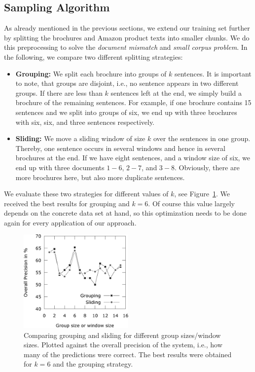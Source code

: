 \subsection{Sampling Algorithm}
As already mentioned in the previous sections, we extend our training set further by splitting the brochures and Amazon product texts into smaller chunks.
We do this preprocessing to solve the \emph{document mismatch} and \emph{small corpus problem}.
In the following, we compare two different splitting strategies:
\begin{itemize}
	\item
		\textbf{Grouping:}
		We split each brochure into groups of $k$ sentences.
		It is important to note, that groups are disjoint, i.e., no sentence appears in two different groups.
		If there are less than $k$ sentences left at the end, we simply build a brochure of the remaining sentences.
		For example, if one brochure contains 15 sentences and we split into groups of six, we end up with three brochures with six, six, and three sentences respectively.
	\item
		\textbf{Sliding:}
		We move a sliding window of size $k$ over the sentences in one group.
		Thereby, one sentence occurs in several windows and hence in several brochures at the end.
		If we have eight sentences, and a window size of six, we end up with three documents $1 - 6$, $2 - 7$, and $3 - 8$.
		Obviously, there are more brochures here, but also more duplicate sentences.
\end{itemize}

We evaluate these two strategies for different values of $k$, see Figure~\ref{fig:sampling_optimization}.
We received the best results for grouping and $k = 6$.
Of course this value largely depends on the concrete data set at hand, so this optimization needs to be done again for every application of our \nto approach.

\begin{figure}
	\begin{center}
		\includegraphics[width=0.5\textwidth]{figures/sampling_optimization.eps}
	\end{center}
	\caption{Comparing grouping and sliding for different group sizes/window sizes. Plotted against the overall precision of the system, i.e., how many of the predictions were correct. The best results were obtained for $k = 6$ and the grouping strategy.}
	\label{fig:sampling_optimization}
\end{figure}

